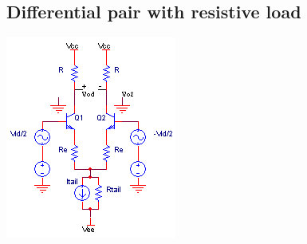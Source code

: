 \subsection{Differential pair with resistive load}
\begin{center}
	\includegraphics{schematics/differentialpair_resistorload.PNG}
\end{center}

